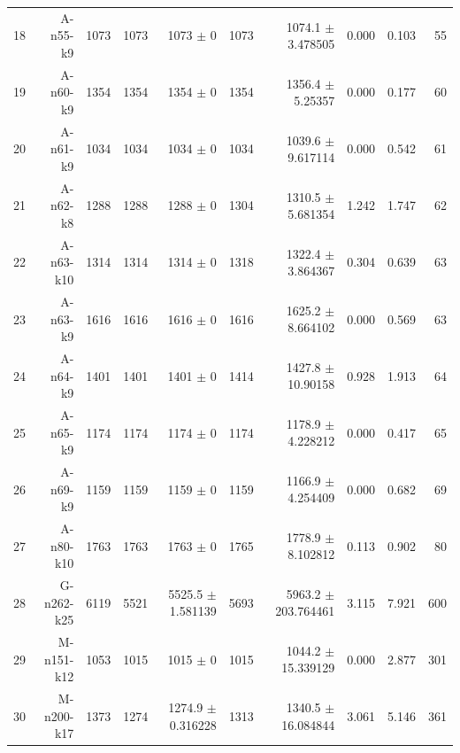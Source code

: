 \begin{table}[htbp]
{\begin{tabular}{rrrrrrrrrr}
18 & A-n55-k9 & 1073 & 1073 & 1073 $\pm$ 0 & 1073 & 1074.1 $\pm$ 3.478505 & 0.000 & 0.103 & 55 \\
19 & A-n60-k9 & 1354 & 1354 & 1354 $\pm$ 0 & 1354 & 1356.4 $\pm$ 5.25357 & 0.000 & 0.177 & 60 \\
20 & A-n61-k9 & 1034 & 1034 & 1034 $\pm$ 0 & 1034 & 1039.6 $\pm$ 9.617114 & 0.000 & 0.542 & 61 \\
21 & A-n62-k8 & 1288 & 1288 & 1288 $\pm$ 0 & 1304 & 1310.5 $\pm$ 5.681354 & 1.242 & 1.747 & 62 \\
22 & A-n63-k10 & 1314 & 1314 & 1314 $\pm$ 0 & 1318 & 1322.4 $\pm$ 3.864367 & 0.304 & 0.639 & 63 \\
23 & A-n63-k9 & 1616 & 1616 & 1616 $\pm$ 0 & 1616 & 1625.2 $\pm$ 8.664102 & 0.000 & 0.569 & 63 \\
24 & A-n64-k9 & 1401 & 1401 & 1401 $\pm$ 0 & 1414 & 1427.8 $\pm$ 10.90158 & 0.928 & 1.913 & 64 \\
25 & A-n65-k9 & 1174 & 1174 & 1174 $\pm$ 0 & 1174 & 1178.9 $\pm$ 4.228212 & 0.000 & 0.417 & 65 \\
26 & A-n69-k9 & 1159 & 1159 & 1159 $\pm$ 0 & 1159 & 1166.9 $\pm$ 4.254409 & 0.000 & 0.682 & 69 \\
27 & A-n80-k10 & 1763 & 1763 & 1763 $\pm$ 0 & 1765 & 1778.9 $\pm$ 8.102812 & 0.113 & 0.902 & 80 \\
28 & G-n262-k25 & 6119 & 5521 & 5525.5 $\pm$ 1.581139 & 5693 & 5963.2 $\pm$ 203.764461 & 3.115 & 7.921 & 600 \\
29 & M-n151-k12 & 1053 & 1015 & 1015 $\pm$ 0 & 1015 & 1044.2 $\pm$ 15.339129 & 0.000 & 2.877 & 301 \\
30 & M-n200-k17 & 1373 & 1274 & 1274.9 $\pm$ 0.316228 & 1313 & 1340.5 $\pm$ 16.084844 & 3.061 & 5.146 & 361 \\
\hline
\end{tabular}%
}
\end{table}
